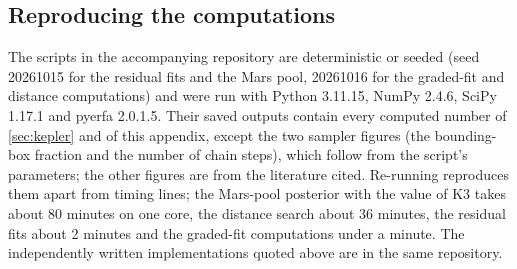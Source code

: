 \subsection{Reproducing the computations}\label{sec:kepler:rerun}

The scripts in the accompanying repository are deterministic or seeded (seed 20261015 for the residual fits and the Mars pool, 20261016 for the graded-fit and distance computations) and were run with Python 3.11.15, NumPy 2.4.6, SciPy 1.17.1 and pyerfa 2.0.1.5. Their saved outputs contain every computed number of \cref{sec:kepler} and of this appendix, except the two sampler figures (the bounding-box fraction and the number of chain steps), which follow from the script's parameters; the other figures are from the literature cited. Re-running reproduces them apart from timing lines; the Mars-pool posterior with the value of $\mathrm{K3}$ takes about 80 minutes on one core, the distance search about 36 minutes, the residual fits about 2 minutes and the graded-fit computations under a minute. The independently written implementations quoted above are in the same repository.
